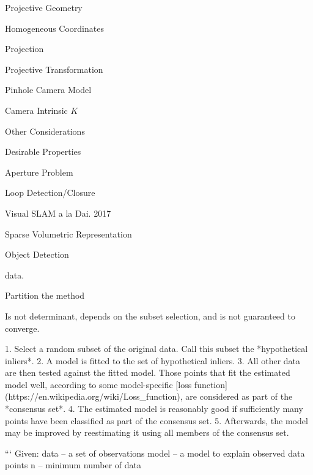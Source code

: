 \begin{section}
\begin{subsubsection}
\begin{subsubsection}
\begin{subsubsection}
\begin{section}{Projective Geometry}
\begin{subsection}{Homogeneous Coordinates}
\begin{subsubsection}
{\begin{subsubsection}{Projection}
\begin{subsubsection}{Projective Transformation}
\begin{subsection}
\begin{subsubsection}
\begin{subsubsection}
\begin{subsubsection}
{\begin{subsubsection}
\begin{subsection}
\begin{subsection} {Pinhole Camera Model}
\begin{subsection} {Camera Intrinsic $K$}
\begin{subsection}
\begin{subsection}
\begin{subsubsection}{Other Considerations}
{\begin{subsection}
\begin{subsubsection}{Desirable Properties}
\begin{section}
\begin{subsection}
\begin{subsection}
\begin{subsection}
\begin{section}
\begin{subsection}
\begin{subsubsection}
\begin{subsubsection}
\begin{subsection}
\begin{section}
\begin{subsection}
\begin{subsubsection}{Aperture Problem}
\begin{subsubsection}
{\begin{section}
\begin{subsubsection}
\begin{subsubsection}
\begin{subsubsection}
\begin{subsection}
\begin{subsection}
\begin{subsection}
\begin{subsection}
\begin{subsection}
\begin{subsection}
\begin{subsection}
\begin{subsubsection}
{\begin{subsubsection}
{\begin{subsubsection}
\begin{section}
\begin{section}
\begin{section}
\begin{subsubsection}
\begin{subsubsection}{Loop Detection/Closure}
\begin{subsubsection}{Visual SLAM a la Dai. 2017}
\begin{subsubsection}{Sparse Volumetric Representation}
\begin{subsection}
\begin{section}{Object Detection}
\begin{subsubsection}
{\begin{subsection}
\begin{subsection}
\begin{section}
\begin{section}
\begin{subsection}
\begin{subsubsection}
\begin{subsubsection}
\begin{subsection}
\begin{subsection}
\begin{subsubsection}
\begin{subsubsection}
\begin{subsubsection}
{\begin{subsection}
\begin{subsection}
\begin{subsection}
\begin{subsection}
\begin{section}
\begin{subsection}
\begin{subsubsection}
\begin{subsubsection}
\begin{subsubsection}
\begin{subsubsection}
\begin{subsubsection}
\begin{subsubsection}
\begin{subsection}
\begin{subsubsection}
\begin{subsection}
\begin{subsection}
\begin{subsubsection}
\begin{subsubsection}
\begin{subsection}
\begin{subsubsection}
{{\begin{section}
\begin{section}
\begin{subsection}
{{{\begin{subsubsection}
\begin{subsubsection}
\begin{subsection}
{\begin{section}
data. 

Partition the method 

Is not determinant, depends on the subset selection, and is not guaranteed to converge.

1. Select a random subset of the original data. Call this subset the *hypothetical inliers*.
2. A model is fitted to the set of hypothetical inliers.
3. All other data are then tested against the fitted model. Those points that fit the estimated model well, according to some model-specific [loss function](https://en.wikipedia.org/wiki/Loss_function), are considered as part of the *consensus set*.
4. The estimated model is reasonably good if sufficiently many points have been classified as part of the consensus set.
5. Afterwards, the model may be improved by reestimating it using all members of the consensus set.

```
Given:
    data – a set of observations
    model – a model to explain observed data points
    n – minimum number of data 
\end{section}}
\end{subsection}
\end{subsubsection}
\end{subsubsection}}}}
\end{subsection}
\end{section}
\end{section}}}
\end{subsubsection}
\end{subsection}
\end{subsubsection}
\end{subsubsection}
\end{subsection}
\end{subsection}
\end{subsubsection}
\end{subsection}
\end{subsubsection}
\end{subsubsection}
\end{subsubsection}
\end{subsubsection}
\end{subsubsection}
\end{subsubsection}
\end{subsection}
\end{section}
\end{subsection}
\end{subsection}
\end{subsection}
\end{subsection}}
\end{subsubsection}
\end{subsubsection}
\end{subsubsection}
\end{subsection}
\end{subsection}
\end{subsubsection}
\end{subsubsection}
\end{subsection}
\end{section}
\end{section}
\end{subsection}
\end{subsection}}
\end{subsubsection}
\end{section}
\end{subsection}
\end{subsubsection}
\end{subsubsection}
\end{subsubsection}
\end{subsubsection}
\end{section}
\end{section}
\end{section}
\end{subsubsection}}
\end{subsubsection}}
\end{subsubsection}
\end{subsection}
\end{subsection}
\end{subsection}
\end{subsection}
\end{subsection}
\end{subsection}
\end{subsection}
\end{subsubsection}
\end{subsubsection}
\end{subsubsection}
\end{section}}
\end{subsubsection}
\end{subsubsection}
\end{subsection}
\end{section}
\end{subsection}
\end{subsubsection}
\end{subsubsection}
\end{subsection}
\end{section}
\end{subsection}
\end{subsection}
\end{subsection}
\end{section}
\end{subsubsection}
\end{subsection}}
\end{subsubsection}
\end{subsection}
\end{subsection}
\end{subsection}
\end{subsection}
\end{subsection}
\end{subsubsection}}
\end{subsubsection}
\end{subsubsection}
\end{subsubsection}
\end{subsection}
\end{subsubsection}
\end{subsubsection}}
\end{subsubsection}
\end{subsection}
\end{section}
\end{subsubsection}
\end{subsubsection}
\end{subsubsection}
\end{section}
